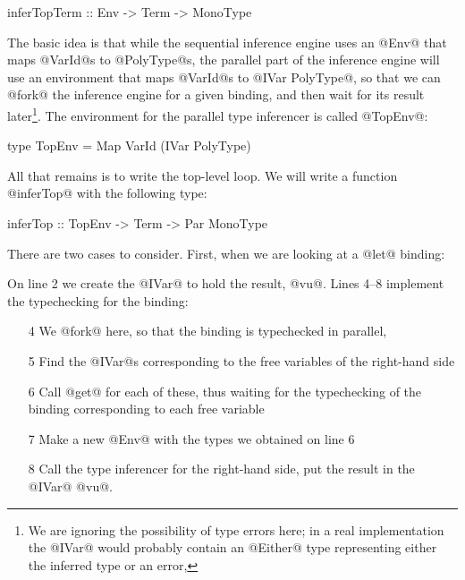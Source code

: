 \begin{haskell}
inferTopTerm :: Env -> Term -> MonoType
\end{haskell}

The basic idea is that while the sequential inference engine uses an
@Env@ that maps @VarId@s to @PolyType@s, the parallel part of the
inference engine will use an environment that maps @VarId@s to
@IVar PolyType@, so that we can @fork@ the inference engine for a
given binding, and then wait for its result later\footnote{We are
  ignoring the possibility of type errors here; in a real
  implementation the @IVar@ would probably contain an @Either@ type
  representing either the inferred type or an error,}.  The environment
for the parallel type inferencer is called @TopEnv@:

\begin{haskell}
type TopEnv = Map VarId (IVar PolyType)
\end{haskell}

All that remains is to write the top-level loop.  We will write a
function @inferTop@ with the following type:

\begin{haskell}
inferTop :: TopEnv -> Term -> Par MonoType
\end{haskell}

\noindent There are two cases to consider.  First, when we are looking at a
@let@ binding:


\noindent On line 2 we create the @IVar@ to hold the result, @vu@.  Lines
4--8 implement the typechecking for the binding:

\begin{itemize}
\item [4] We @fork@ here, so that the binding is typechecked in
  parallel,
\item [5] Find the @IVar@s corresponding to the free variables of the right-hand side
\item [6] Call @get@ for each of these, thus waiting for the
  typechecking of the binding corresponding to each free variable
\item [7] Make a new @Env@ with the types we obtained on line 6
\item [8] Call the type inferencer for the right-hand side, put the
  result in the @IVar@ @vu@.
\end{itemize}

